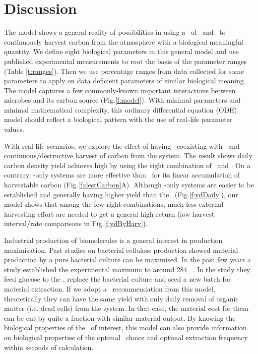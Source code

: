 \documentclass[../thesis.tex]{subfiles} %
\begin{document}
\section{Discussion}
The model shows a general reality of possibilities in using a \pbs\ of \bac\ and \phy\ to continuously harvest carbon from the atmosphere with a biological meaningful quantity.  We define eight biological parameters in this general model and use published experimental measurements to root the basis of the parameter ranges (Table \ref{t:ranges}).  Then we use percentage ranges from data collected for some parameters to apply on data deficient parameters of similar biological meaning.  The model captures a few commonly-known important interactions between microbes and its carbon source (Fig.\ref{f:model}).  With minimal parameters and minimal mathematical complexity, this ordinary differential equation (ODE) model should reflect a biological pattern with the use of real-life parameter values.

With real-life scenarios, we explore the effect of having \bac\ coexisting with \phy\ and continuous/destructive harvest of carbon from the system.  The result shows daily carbon density yield achieves high by using the right combination of \phy\ and \bac.  On a contrary, \phy-only systems are more effective than \pbs\ for its linear accumulation of harvestable carbon (Fig.\ref{f:destCarbon}A).  Although \phy-only systems are easier to be established and generally having higher yield than the \pbs\ (Fig.\ref{f:ydDaily}), our model shows that among the few right combinations, much less external harvesting effort are needed to get a general high return (low harvest interval/rate comparisons in Fig.\ref{f:ydByHarv}).

Industrial production of biomolecules is a general interest in production maximisation.  Past studies on bacterial cellulose production showed material production by a pure bacterial culture can be maximised.  In the past few years a study established the experimental maximum to around 284 \dxdt\ \autocite{aytekin2016statistical}.  In the study they feed glucose to the \bac, replace the bacterial culture and seed a new batch for material extraction.  If we adopt a \phy\ recommendation from this model, theoretically they can have the same yield with only daily removal of organic matter (i.e. dead cells) from the system.  In that case, the material cost for them can be cut by quite a fraction with similar material output.  By knowing the biological properties of the \bac\ of interest, this model can also provide information on biological properties of the optimal \phy\ choice and optimal extraction frequency within seconds of calculation.
\end{document}

